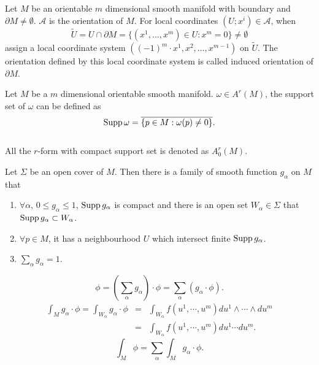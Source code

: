 \begin{newdef} 
Let $M$ be an orientable $m$ dimensional smooth manifold with boundary and $\partial M \neq \emptyset$. $\mathcal{A}$ is the orientation of $M$. For local coordinates $(U;x^i) \in \mathcal{A}$, when 
\[\tilde{U} = U \cap \partial M = \{(x^1,\ldots,x^m) \in U:x^m=0 \} \neq \emptyset \]
assign a local coordinate system $((-1)^m \cdot x^1,x^2,\ldots,x^{m-1})$ on $\tilde{U}$. The orientation defined by this local coordinate system is called induced orientation of $\partial M$.
\end{newdef}

\begin{newdef} 
Let $M$ be a $m$ dimensional orientable smooth manifold. $\omega \in A^r(M)$, the support set of $\omega$ can be defined as
\[{\rm Supp} \, \omega = \overline {\{ p \in M :\omega(p) \neq 0\}}.\]\\
All the $r$-form with compact support set is denoted as $A^r_0(M)$.
\end{newdef}

\begin{newdef}
Let $\Sigma$ be an open cover of $M$. Then there is a family of smooth function $g_{\alpha}$ on $M$ that
\begin{enumerate}
\item $\forall \alpha$, $0 \leq g_{\alpha} \leq 1$, ${\rm Supp} \, g_{\alpha}$ is compact and there is an open set $W_{\alpha} \in  \Sigma$ that ${\rm Supp} \,  g_{\alpha} \subset W_{\alpha}$.
\item $\forall p \in M$, it has a neighbourhood $U$ which intersect finite ${\rm Supp} \, g_{\alpha}$.
\item $\sum_{\alpha} g_{\alpha} = 1$.
\end{enumerate}
\end{newdef}


\begin{newdef}
\[\phi = (\sum_{\alpha} g_{\alpha})\cdot \phi = \sum_{\alpha} (g_{\alpha} \cdot \phi).\]
\begin{eqnarray}
\int_{M} g_{\alpha} \cdot \phi = \int_{W_{\alpha}} g_{\alpha} \cdot \phi &=& \int_{W_{\alpha}} f(u^1,\cdots,u^m) du^1 \wedge \cdots \wedge du^m \nonumber \\
&=& \int_{W_{\alpha}} f(u^1,\cdots,u^m) du^1 \cdots du^m. \nonumber
\end{eqnarray}
\[\int_{M} \phi = \sum_{\alpha} \int_{M} g_{\alpha} \cdot \phi.\]
\end{newdef}

